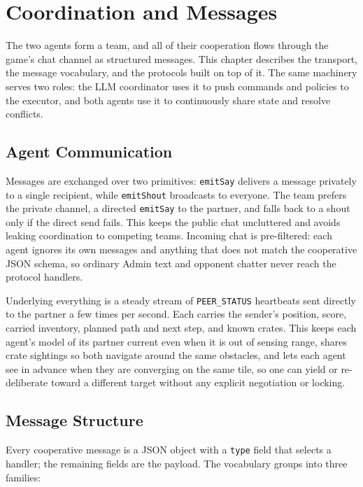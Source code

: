 \chapter{Coordination and Messages}
\label{ch:coordination}

The two agents form a team, and all of their cooperation flows through the game's
chat channel as structured messages. This chapter describes the transport, the
message vocabulary, and the protocols built on top of it. The same machinery serves
two roles: the LLM coordinator uses it to push commands and policies to the executor,
and both agents use it to continuously share state and resolve conflicts.

\section{Agent Communication}
\label{sec:agent-comm}

Messages are exchanged over two primitives: \texttt{emitSay} delivers a message
privately to a single recipient, while \texttt{emitShout} broadcasts to everyone. The
team prefers the private channel, a directed \texttt{emitSay} to the partner, and
falls back to a shout only if the direct send fails. This keeps the public chat
uncluttered and avoids leaking coordination to competing teams. Incoming chat is
pre-filtered: each agent ignores its own messages and anything that does not match
the cooperative JSON schema, so ordinary Admin text and opponent chatter never reach
the protocol handlers.

Underlying everything is a steady stream of \texttt{PEER\_STATUS} heartbeats sent
directly to the partner a few times per second. Each carries the sender's position,
score, carried inventory, planned path and next step, and known crates. This keeps each
agent's model of its partner current even when it is out of sensing range, shares crate
sightings so both navigate around the same obstacles, and lets each agent see in advance
when they are converging on the same tile, so one can yield or re-deliberate toward a
different target without any explicit negotiation or locking.

\section{Message Structure}
\label{sub:msg-structure}
Every cooperative message is a JSON object with a \texttt{type} field that selects a
handler; the remaining fields are the payload. The vocabulary groups into three
families:

